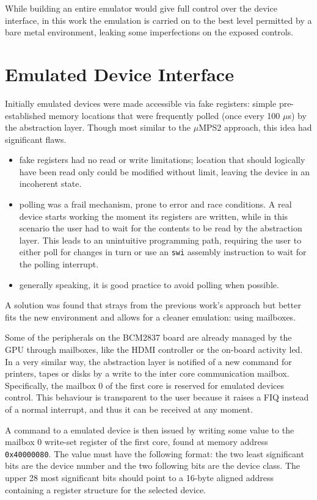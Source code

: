 \documentclass[12pt,a4paper,openright,twoside]{report}
\begin{document}
While building an entire emulator would give full control over the device interface,
in this work the emulation is carried on to the best level permitted by a bare
metal environment, leaking some imperfections on the exposed controls.

\section{Emulated Device Interface}
\label{emulatedinterface}
Initially emulated devices were made accessible via fake registers: simple pre-established
memory locations that were frequently polled (once every 100 $\mu$s) by the abstraction layer.
Though most similar to the $\mu$MPS2 approach, this idea had significant flaws.
\begin{itemize}
    \item fake registers had no read or write limitations; location that should
        logically have been read only could be modified without limit, leaving
        the device in an incoherent state.
    \item polling was a frail mechanism, prone to error and race conditions. 
         A real device starts working the moment
        its registers are written, while in this scenario the user had to wait 
        for the contents to be read by the abstraction layer. This leads to 
        an unintuitive programming path, requiring the user to either poll 
        for changes in turn or use an {\tt swi} assembly instruction to wait for
        the polling interrupt.
    \item generally speaking, it is good practice to avoid polling when possible.
\end{itemize}

A solution was found that strays from the previous work's approach but better
fits the new environment and allows for a cleaner emulation: using mailboxes.

Some of the peripherals on the BCM2837 board are already managed by the GPU
through mailboxes, like the HDMI controller or the on-board activity led. In 
a very similar way, the abstraction layer is notified of a new command for printers,
tapes or disks by a write to the inter core communication mailbox.
Specifically, the mailbox 0 of the first core is reserved for emulated devices control.
This behaviour is transparent to the user because it raises a FIQ instead of a 
normal interrupt, and thus it can be received at any moment.

A command to a emulated device is then issued by writing some value to the mailbox
0 write-set register of the first core, found at memory address {\tt 0x40000080}.
The value must have the following format: the two least significant bits are the
device number and the two following bits are the device class.
The upper 28 most significant bits should point to a 16-byte aligned address containing
a register structure for the selected device.
\end{document}
